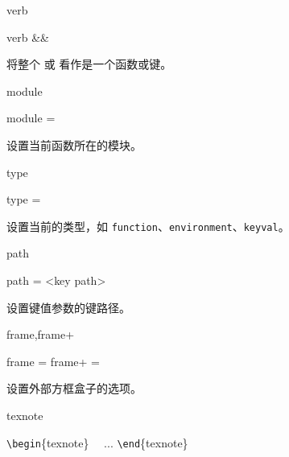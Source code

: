 \documentclass[twoside]{book}
\begin{document}
\begin{keyval}[path=doc/function]{verb}
  \begin{syntax}
    verb &&
  \end{syntax}
将整个  或  看作是一个函数或键。
\end{keyval}

\begin{keyval}[path=doc/function]{module}
  \begin{syntax}
    module = 
  \end{syntax}
设置当前函数所在的模块。
\end{keyval}

\begin{keyval}[path=doc/function]{type}
  \begin{syntax}
    type = 
  \end{syntax}
设置当前的类型，如 \texttt{function}、\texttt{environment}、\texttt{keyval}。
\end{keyval}


\begin{keyval}[path=doc/function]{path}
  \begin{syntax}
    path = <{key path}>
  \end{syntax}
设置键值参数的键路径。
\end{keyval}

\begin{keyval}[path=doc/function]{frame,frame+}
  \begin{syntax}
    frame  = 
    frame+ = 
  \end{syntax}
设置外部方框盒子的选项。
\end{keyval}

\begin{function}[type=environment]{texnote}
  \begin{syntax}
    \verb|\begin|\{texnote\}
    ~~... 
    \verb|\end|\{texnote\}
  \end{syntax}
\end{function}
\end{document}
